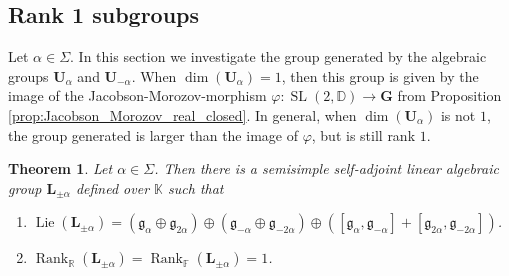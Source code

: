 \documentclass[12pt]{amsart}
\newcommand{\F}{\mathbb{F} }
\newcommand{\R}{\mathbb{R} }
\newcommand{\D}{\mathbb{D} }
\newcommand{\K}{\mathbb{K}}
\newcommand{\frakg}{\mathfrak{g}}
\newcommand{\bG}{\mathbf{G}}
\newcommand{\bU}{\mathbf{U}}
\newcommand{\bL}{\mathbf{L}}
\numberwithin{equation}{section}
\newtheorem{theorem}{Theorem}[section]
\theoremstyle{remark} %
\begin{document}
\subsection{Rank 1 subgroups}\label{sec:rank1}
Let $\alpha \in \Sigma$. In this section we investigate the group generated by the algebraic groups $\bU_\alpha$ and $\bU_{-\alpha}$. When $\dim(\bU_\alpha) = 1$, then this group is given by the image of the Jacobson-Morozov-morphism $\varphi \colon \operatorname{SL}(2,\D) \to \bG$ from Proposition \ref{prop:Jacobson_Morozov_real_closed}. In general, when $\dim(\bU_\alpha)$ is not $1$, the group generated is larger than the image of $\varphi$, but is still rank $1$. 

\begin{theorem}\label{thm:levi_group}
	Let $\alpha \in \Sigma$. Then there is a semisimple self-adjoint linear algebraic group $\bL_{\pm \alpha}$ defined over $\K$ such that
	\begin{enumerate}
		\item [(i)] $\operatorname{Lie}(\bL_{\pm \alpha}) = ( \frakg_\alpha \oplus \frakg_{2\alpha} ) \oplus (\frakg_{-\alpha} \oplus \frakg_{-2\alpha} ) \oplus ( [\frakg_\alpha , \frakg_{-\alpha}] + [\frakg_{2\alpha}, \frakg_{-2\alpha}] )$.
		\item [(ii)] $\operatorname{Rank}_\R(\bL_{\pm \alpha}) = \operatorname{Rank}_\F(\bL_{\pm \alpha}) = 1$.
	\end{enumerate}
\end{theorem}
\end{document}
